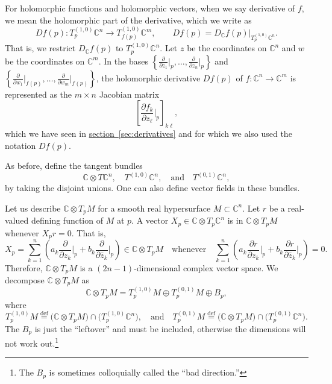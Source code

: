 \documentclass[12pt,openany]{book}
\newcommand{\C}{{\mathbb{C}}}
\theoremstyle{plain}
\theoremstyle{remark}
\theoremstyle{definition}
\theoremstyle{exercise}
\theoremstyle{example}
\newcommand{\sectionref}[1]{\hyperref[#1]{section~\ref*{#1}}}
\begin{document}
For holomorphic functions and holomorphic vectors,
when we say derivative of $f$, we mean the holomorphic part of the
derivative, which we write as
%
\begin{equation*}
D f(p) \colon T_p^{(1,0)} \C^n \to T_{f(p)}^{(1,0)} \C^m ,
\qquad
D f(p) = D_{\C} f(p) \big|_{T_p^{(1,0)} \C^n} .
\end{equation*}
That is, we restrict $D_\C f(p)$ to $T_p^{(1,0)} \C^n$.
Let $z$ be the coordinates on $\C^n$ and
$w$ be the coordinates on $\C^m$.
In the bases
$\left\{ \frac{\partial}{\partial z_1} \big|_p,\ldots,
\frac{\partial}{\partial z_n} \big|_p \right\}$
and
$\left\{ \frac{\partial}{\partial w_1} \big|_{f(p)},\ldots,
\frac{\partial}{\partial w_m} \big|_{f(p)} \right\}$,
the holomorphic derivative $Df(p)$ of $f \colon \C^{n} \to \C^m$
is represented as the $m \times n$ Jacobian matrix
\begin{equation*}
\left[
\frac{\partial f_k}{\partial z_\ell} \Big|_p
\right]_{k\ell} ,
\end{equation*}
which we have seen in \sectionref{sec:derivatives}
and for which we also used the notation $Df(p)$.

As before, define the tangent bundles
\begin{equation*}
\C \otimes T\C^n,
\quad
T^{(1,0)} \C^n,
\quad \text{and} \quad
T^{(0,1)} \C^n ,
\end{equation*}
by taking the disjoint unions.
One can also define vector fields in these bundles.

Let us describe $\C \otimes T_pM$
for a smooth real hypersurface $M \subset \C^n$.
Let $r$ be a real-valued defining function of
$M$ at $p$.  A vector
$X_p \in \C \otimes T_p\C^n$ is in
$\C \otimes T_pM$ whenever $X_p r = 0$.  That is,
\begin{equation*}
X_p = \sum_{k=1}^n
\left(
a_k
\frac{\partial}{\partial z_k} \Big|_p
+
b_k
\frac{\partial}{\partial \bar{z}_k} \Big|_p
\right) \in \C \otimes T_p M
\quad
\text{whenever}
\quad
 \sum_{k=1}^n
\left(
a_k
\frac{\partial r}{\partial z_k} \Big|_p
+
b_k
\frac{\partial r}{\partial \bar{z}_k} \Big|_p
\right)
= 0 .
\end{equation*}
Therefore, $\C \otimes T_p M$ is a $(2n-1)$-dimensional complex vector space.
We decompose $\C \otimes T_p M$ as
\begin{equation*}
\C \otimes T_pM =
T_p^{(1,0)} M \oplus T_p^{(0,1)} M \oplus B_p ,
\end{equation*}
where
\begin{equation*}
T_p^{(1,0)} M \overset{\text{def}}{=} \bigl( \C \otimes T_pM \bigr) \cap
\bigl( T_p^{(1,0)} \C^n \bigr),  \quad \text{and}
\quad
T_p^{(0,1)} M \overset{\text{def}}{=} \bigl( \C \otimes T_pM \bigr) \cap
\bigl( T_p^{(0,1)} \C^n \bigr) .
\end{equation*}
The $B_p$ is just the ``leftover'' and must
be included, otherwise the dimensions will not work out.\footnote{%
The $B_p$ is sometimes colloquially called the ``bad direction.''}
\end{document}
